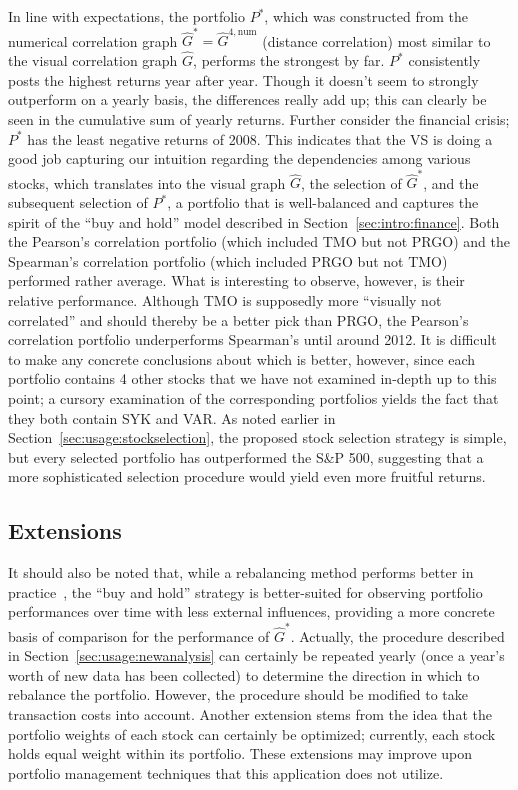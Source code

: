 In line with expectations, the portfolio $P^*$, which was constructed from the 
numerical correlation graph $\hat{G}^* = \hat{G}^{4,\text{num}}$ (distance 
correlation) most similar to the visual correlation graph $\hat{G}$, 
performs the strongest by far. $P^*$ consistently posts the highest returns 
year after year. Though it doesn't seem to strongly outperform on a yearly 
basis, the differences really add up; this can clearly be seen in the 
cumulative sum of yearly returns. Further 
consider the financial crisis; $P^*$ has the least negative returns of 2008. 
This indicates that the VS is doing a good job capturing our intuition 
regarding the dependencies among various stocks, which translates into the 
visual graph $\hat{G}$, the selection of $\hat{G}^*$, and the subsequent 
selection of $P^*$, 
a portfolio that is well-balanced and captures the spirit of the ``buy and 
hold'' model described in Section~\ref{sec:intro:finance}.
Both the Pearson's correlation portfolio (which included TMO but not PRGO) and 
the Spearman's correlation portfolio (which included PRGO but not TMO) 
performed rather average. What is interesting to observe, however, is their 
relative performance. Although TMO is supposedly more 
``visually not correlated'' and should thereby be a better pick than PRGO, the 
Pearson's correlation portfolio underperforms Spearman's until around 2012. It 
is difficult to make any concrete conclusions about which is better, however, 
since each portfolio contains 4 other stocks that we have not examined 
in-depth up to this point; a cursory examination of the corresponding 
portfolios yields the fact that they both contain SYK and VAR.
As noted earlier in Section~\ref{sec:usage:stockselection}, the proposed stock 
selection strategy is simple, but every selected portfolio has outperformed the 
S\&P 500, suggesting that a more sophisticated selection procedure would 
yield even more fruitful returns.

\subsection{Extensions}
\label{sec:usage:extensions}

It should also be noted that, while a rebalancing method performs better in 
practice~\cite{liuh2016}, the ``buy and hold'' strategy is better-suited for 
observing portfolio performances over time with less external influences, 
providing a more concrete basis of comparison for the performance of 
$\hat{G}^*$. 
Actually, the procedure described in Section~\ref{sec:usage:newanalysis}
can certainly be repeated yearly (once a year's worth of new data has been 
collected) to determine the direction in which to 
rebalance the portfolio. However, the procedure should be modified to take 
transaction costs into account. Another extension stems from the idea that the 
portfolio weights of each stock can certainly be optimized; currently, each 
stock holds equal weight within its portfolio. These extensions may improve 
upon portfolio management techniques that this application does not utilize.

